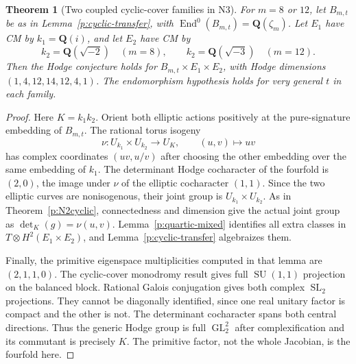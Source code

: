 \documentclass[11pt,reqno]{article}
\theoremstyle{emphasizedplain}
\newtheorem{theorem}{Theorem}[section]
\theoremstyle{emphasizeddefinition}
\theoremstyle{emphasizeddefinition}
\DeclareMathOperator{\End}{End}
\DeclareMathOperator{\GL}{GL}
\DeclareMathOperator{\SL}{SL}
\DeclareMathOperator{\SU}{SU}
\newcommand{\Q}{\mathbf Q}
\begin{document}
\begin{theorem}[Two coupled cyclic-cover families in N3]\label{p:N3cyclic}
For $m=8$ or $12$, let $B_{m,t}$ be as in
Lemma~\ref{p:cyclic-transfer}, with
$\End^0(B_{m,t})=\Q(\zeta_m)$. Let $E_1$ have CM by $k_1=\Q(i)$,
and let $E_2$ have CM by
\[
 k_2=\Q(\sqrt{-2})\quad(m=8),\qquad
 k_2=\Q(\sqrt{-3})\quad(m=12).
\]
Then the Hodge conjecture holds for $B_{m,t}\times E_1\times E_2$,
with Hodge dimensions $(1,4,12,14,12,4,1)$. The endomorphism
hypothesis holds for very general $t$ in each family.
\end{theorem}
\begin{proof}
Here $K=k_1k_2$. Orient both elliptic actions positively at the
pure-signature embedding of $B_{m,t}$. The rational torus isogeny
\[
 \nu:U_{k_1}\times U_{k_2}\longrightarrow U_K,
 \qquad (u,v)\longmapsto uv
\]
has complex coordinates $(uv,u/v)$ after choosing the other
embedding over the same embedding of $k_1$. The determinant Hodge
cocharacter of the fourfold is $(2,0)$, the image under $\nu$ of
the elliptic cocharacter $(1,1)$. Since the two elliptic curves
are nonisogenous, their joint group is $U_{k_1}\times U_{k_2}$.
As in Theorem~\ref{p:N2cyclic}, connectedness and dimension give
the actual joint group as $\det_K(g)=\nu(u,v)$.
Lemma~\ref{p:quartic-mixed} identifies all extra classes in
$T\otimes H^2(E_1\times E_2)$, and
Lemma~\ref{p:cyclic-transfer} algebraizes them.

Finally, the primitive eigenspace multiplicities computed in that
lemma are $(2,1,1,0)$. The cyclic-cover monodromy result
\cite[Proposition 4.7(i)]{MoonenCyclic} gives full $\SU(1,1)$
projection on the balanced block. Rational Galois conjugation gives
both complex $\SL_2$ projections. They cannot be diagonally
identified, since one real unitary factor is compact and the other
is not. The determinant cocharacter spans both central directions.
Thus the generic Hodge group is full $\GL_2^2$ after
complexification and its commutant is precisely $K$.
The primitive factor, not the whole Jacobian, is the fourfold here.
\end{proof}
\end{document}
